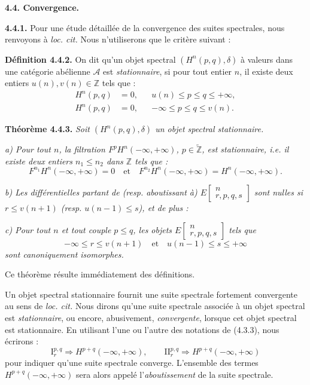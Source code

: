 \clearpage
{}%
\begingroup\small\setlength{\parskip}{0pt}\setlength{\emergencystretch}{1.5em}
\medskip\noindent\textbf{4.4. Convergence.}

\medskip\noindent\textbf{4.4.1.}\quad
Pour une étude détaillée de la convergence des suites spectrales, nous
renvoyons à \emph{loc. cit.} Nous n'utiliserons que le critère suivant :

\medskip\noindent\textbf{Définition 4.4.2.}\quad
On dit qu'un objet spectral $(H^n(p,q),\delta)$ à valeurs dans une catégorie
abélienne $\mathcal A$ est \emph{stationnaire}, si pour tout entier $n$, il
existe deux entiers $u(n),v(n)\in\mathbb Z$ tels que :
\[
\begin{aligned}
H^n(p,q)&=0,&&u(n)\leq p\leq q\leq+\infty,\\
H^n(p,q)&=0,&&-\infty\leq p\leq q\leq v(n).
\end{aligned}
\]

\medskip\noindent\textbf{Théorème 4.4.3.}\quad
\textit{Soit $(H^n(p,q),\delta)$ un objet spectral stationnaire.}

\textit{a) Pour tout $n$, la filtration
$F^pH^n(-\infty,+\infty)$, $p\in\widetilde{\mathbb Z}$, est stationnaire,
i.e. il existe deux entiers $n_1\leq n_2$ dans $\mathbb Z$ tels que :}
\[
F^{n_1}H^n(-\infty,+\infty)=0
\quad\text{et}\quad
F^{n_2}H^n(-\infty,+\infty)=H^n(-\infty,+\infty).
\]

\textit{b) Les différentielles partant de (resp. aboutissant à)
$E\!\left[\begin{smallmatrix}n\\r,p,q,s\end{smallmatrix}\right]$ sont nulles
si $r\leq v(n+1)$ (resp. $u(n-1)\leq s$), et de plus :}

\textit{c) Pour tout $n$ et tout couple $p\leq q$, les objets
$E\!\left[\begin{smallmatrix}n\\r,p,q,s\end{smallmatrix}\right]$ tels que}
\[
-\infty\leq r\leq v(n+1)
\quad\text{et}\quad
u(n-1)\leq s\leq+\infty
\]
\textit{sont canoniquement isomorphes.}

Ce théorème résulte immédiatement des définitions.

Un objet spectral stationnaire fournit une suite spectrale fortement
convergente au sens de \emph{loc. cit.} Nous dirons qu'une suite spectrale
associée à un objet spectral est \emph{stationnaire}, ou encore,
abusivement, \emph{convergente}, lorsque cet objet spectral est stationnaire.
En utilisant l'une ou l'autre des notations de (4.3.3), nous écrirons :
\[
\mathrm I_r^{p,q}\Longrightarrow H^{p+q}(-\infty,+\infty),
\qquad
\mathrm{II}_r^{p,q}\Longrightarrow H^{p+q}(-\infty,+\infty)
\]
pour indiquer qu'une suite spectrale converge. L'ensemble des termes
$H^{p+q}(-\infty,+\infty)$ sera alors appelé l'\emph{aboutissement} de la
suite spectrale.
\endgroup
